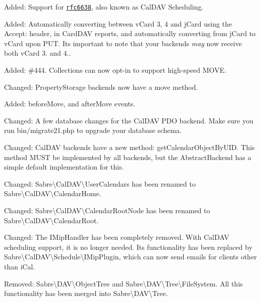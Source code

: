 \begin{DoxyItemize}
\item Added\+: Support for \href{http://tools.ietf.org/html/rfc6638}{\tt rfc6638}, also known as Cal\+D\+AV Scheduling.
\item Added\+: Automatically converting between v\+Card 3, 4 and j\+Card using the {\ttfamily Accept\+:} header, in Card\+D\+AV reports, and automatically converting from j\+Card to v\+Card upon {\ttfamily P\+UT}. It\textquotesingle{}s important to note that your backends {\itshape may} now receive both v\+Card 3. and 4..
\item Added\+: \#444. Collections can now opt-\/in to support high-\/speed {\ttfamily M\+O\+VE}.
\item Changed\+: Property\+Storage backends now have a {\ttfamily move} method.
\item Added\+: {\ttfamily before\+Move}, and {\ttfamily after\+Move} events.
\item Changed\+: A few database changes for the Cal\+D\+AV P\+DO backend. Make sure you run {\ttfamily bin/migrate21.\+php} to upgrade your database schema.
\item Changed\+: Cal\+D\+AV backends have a new method\+: {\ttfamily get\+Calendar\+Object\+By\+U\+ID}. This method M\+U\+ST be implemented by all backends, but the {\ttfamily Abstract\+Backend} has a simple default implementation for this.
\item Changed\+: {\ttfamily Sabre\textbackslash{}Cal\+D\+AV\textbackslash{}User\+Calendars} has been renamed to {\ttfamily Sabre\textbackslash{}Cal\+D\+AV\textbackslash{}Calendar\+Home}.
\item Changed\+: {\ttfamily Sabre\textbackslash{}Cal\+D\+AV\textbackslash{}Calendar\+Root\+Node} has been renamed to {\ttfamily Sabre\textbackslash{}Cal\+D\+AV\textbackslash{}Calendar\+Root}.
\item Changed\+: The I\+Mip\+Handler has been completely removed. With Cal\+D\+AV scheduling support, it is no longer needed. It\textquotesingle{}s functionality has been replaced by {\ttfamily Sabre\textbackslash{}Cal\+D\+AV\textbackslash{}Schedule\textbackslash{}I\+Mip\+Plugin}, which can now send emails for clients other than i\+Cal.
\item Removed\+: {\ttfamily Sabre\textbackslash{}D\+AV\textbackslash{}Object\+Tree} and {\ttfamily Sabre\textbackslash{}D\+AV\textbackslash{}Tree\textbackslash{}File\+System}. All this functionality has been merged into {\ttfamily Sabre\textbackslash{}D\+AV\textbackslash{}Tree}.

\end{DoxyItemize}
